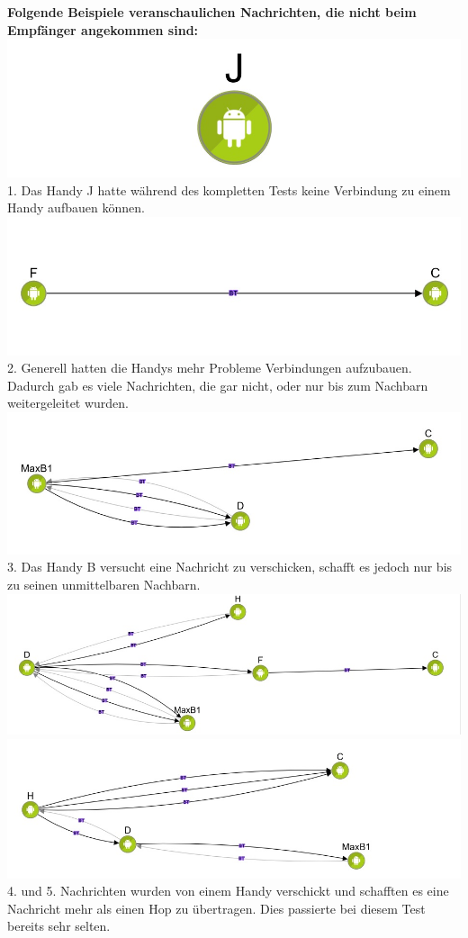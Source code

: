 \textbf{Folgende Beispiele veranschaulichen Nachrichten, die nicht beim
Empfänger angekommen sind:}
\includegraphics{belege/grosstests/Bilder/Test2Misserfolg1.jpg} 1. Das
Handy J hatte während des kompletten Tests keine Verbindung zu einem
Handy aufbauen können.
\includegraphics{belege/grosstests/Bilder/Test2Misserfolg3.jpg} 2.
Generell hatten die Handys mehr Probleme Verbindungen aufzubauen.
Dadurch gab es viele Nachrichten, die gar nicht, oder nur bis zum
Nachbarn weitergeleitet wurden.
\includegraphics{belege/grosstests/Bilder/Test2Misserfolg4.jpg} 3. Das
Handy B versucht eine Nachricht zu verschicken, schafft es jedoch nur
bis zu seinen unmittelbaren Nachbarn.
\includegraphics{belege/grosstests/Bilder/Test2Misserfolg5.jpg}
\includegraphics{belege/grosstests/Bilder/Test2Misserfolg6.jpg} 4. und
5. Nachrichten wurden von einem Handy verschickt und schafften es eine
Nachricht mehr als einen Hop zu übertragen. Dies passierte bei diesem
Test bereits sehr selten.

